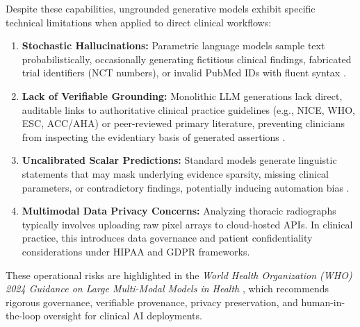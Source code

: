 \documentclass[journal,10pt,twocolumn]{IEEEtran}
\begin{document}
Despite these capabilities, ungrounded generative models exhibit specific technical limitations when applied to direct clinical workflows:
\begin{enumerate}
    \item \textbf{Stochastic Hallucinations:} Parametric language models sample text probabilistically, occasionally generating fictitious clinical findings, fabricated trial identifiers (NCT numbers), or invalid PubMed IDs with fluent syntax \cite{singhal2023large, wu2025medical}.
    \item \textbf{Lack of Verifiable Grounding:} Monolithic LLM generations lack direct, auditable links to authoritative clinical practice guidelines (e.g., NICE, WHO, ESC, ACC/AHA) or peer-reviewed primary literature, preventing clinicians from inspecting the evidentiary basis of generated assertions \cite{edge2024from, chen2025enhancing}.
    \item \textbf{Uncalibrated Scalar Predictions:} Standard models generate linguistic statements that may mask underlying evidence sparsity, missing clinical parameters, or contradictory findings, potentially inducing automation bias \cite{kocielnik2019will}.
    \item \textbf{Multimodal Data Privacy Concerns:} Analyzing thoracic radiographs typically involves uploading raw pixel arrays to cloud-hosted APIs. In clinical practice, this introduces data governance and patient confidentiality considerations under HIPAA and GDPR frameworks.
\end{enumerate}

These operational risks are highlighted in the \textit{World Health Organization (WHO) 2024 Guidance on Large Multi-Modal Models in Health} \cite{who2024lmm}, which recommends rigorous governance, verifiable provenance, privacy preservation, and human-in-the-loop oversight for clinical AI deployments.
\end{document}
